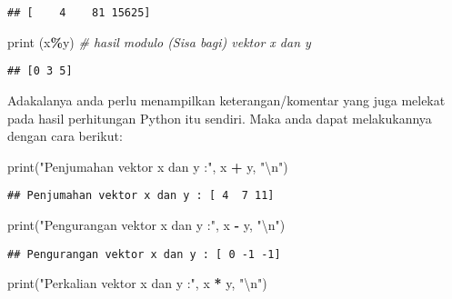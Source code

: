 \documentclass[
]{docs}
\newenvironment{Shaded}{\begin{snugshade}}{\end{snugshade}}
\newcommand{\BuiltInTok}[1]{#1}
\newcommand{\CharTok}[1]{\textcolor[rgb]{0.31,0.60,0.02}{#1}}
\newcommand{\CommentTok}[1]{\textcolor[rgb]{0.56,0.35,0.01}{\textit{#1}}}
\newcommand{\NormalTok}[1]{#1}
\newcommand{\OperatorTok}[1]{\textcolor[rgb]{0.81,0.36,0.00}{\textbf{#1}}}
\newcommand{\StringTok}[1]{\textcolor[rgb]{0.31,0.60,0.02}{#1}}
\begin{document}
\begin{verbatim}
## [    4    81 15625]
\end{verbatim}

\begin{Shaded}
\begin{Highlighting}[]
\BuiltInTok{print}\NormalTok{ (x}\OperatorTok{\%}\NormalTok{y)             }\CommentTok{\# hasil modulo (Sisa bagi) vektor x dan y}
\end{Highlighting}
\end{Shaded}

\begin{verbatim}
## [0 3 5]
\end{verbatim}

Adakalanya anda perlu menampilkan keterangan/komentar yang juga melekat pada hasil perhitungan Python itu sendiri. Maka anda dapat melakukannya dengan cara berikut:

\begin{Shaded}
\begin{Highlighting}[]
\BuiltInTok{print}\NormalTok{(}\StringTok{"Penjumahan vektor x dan y :"}\NormalTok{, x }\OperatorTok{+}\NormalTok{ y, }\StringTok{"}\CharTok{\textbackslash{}n}\StringTok{"}\NormalTok{)}
\end{Highlighting}
\end{Shaded}

\begin{verbatim}
## Penjumahan vektor x dan y : [ 4  7 11]
\end{verbatim}

\begin{Shaded}
\begin{Highlighting}[]
\BuiltInTok{print}\NormalTok{(}\StringTok{"Pengurangan vektor x dan y :"}\NormalTok{, x }\OperatorTok{{-}}\NormalTok{ y, }\StringTok{"}\CharTok{\textbackslash{}n}\StringTok{"}\NormalTok{)}
\end{Highlighting}
\end{Shaded}

\begin{verbatim}
## Pengurangan vektor x dan y : [ 0 -1 -1]
\end{verbatim}

\begin{Shaded}
\begin{Highlighting}[]
\BuiltInTok{print}\NormalTok{(}\StringTok{"Perkalian vektor x dan y :"}\NormalTok{, x }\OperatorTok{*}\NormalTok{ y, }\StringTok{"}\CharTok{\textbackslash{}n}\StringTok{"}\NormalTok{)}
\end{Highlighting}
\end{Shaded}
\end{document}
